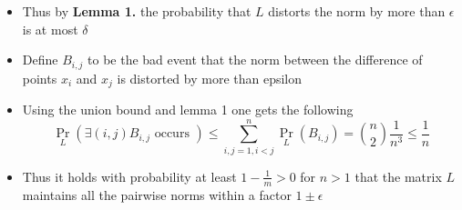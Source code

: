 \begin{itemize}
\begin{itemize}
    \item Thus by \textbf{Lemma 1.} the probability that $L$ distorts the norm by more than $\epsilon$ is at most $\delta$
    \item Define $B_{i,j}$ to be the bad event that the norm between the difference of points $x_i$ and $x_j$ is distorted by more than epsilon 
    \item Using the union bound and lemma 1 one gets the following
    \[
      \Pr_{L}(\exists(i,j) B_{i,j} \text{ occurs }) \leq \sum_{i,j = 1, i<j}^n \Pr_L(B_{i,j}) = {n \choose 2} \frac{1}{n^3} \leq \frac{1}{n}
    \]
    \item Thus it holds with probability at least $1- \frac1m > 0$ for $n > 1$ that the matrix $L$ maintains all the pairwise norms within a factor $1 \pm \epsilon$
  \end{itemize}
\end{itemize}

